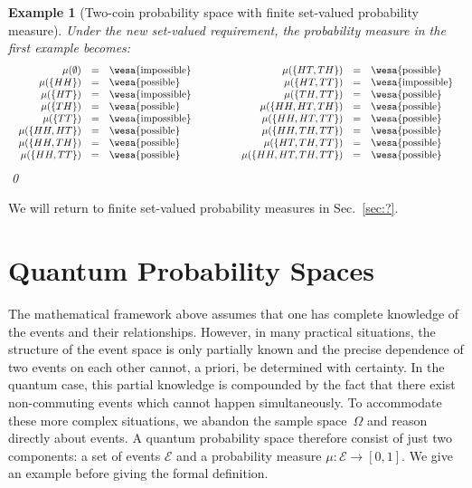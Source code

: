 \documentclass{article}
\theoremstyle{indented}
\newtheorem{example}{Example}
\newcommand{\qevents}{\ensuremath{\mathcal{E}}}
\newcommand{\pmeas}{\ensuremath{\mu}}
\newcommand{\poss}{{\mbox{\wesa{possible}}}}
\newcommand{\imposs}{{\mbox{\wesa{impossible}}}}
\theoremstyle{plain}
\theoremstyle{plain}
\begin{document}
\begin{example}[Two-coin probability space with finite set-valued
  probability measure] Under the new set-valued requirement, the
  probability measure in the first example becomes:
\[\begin{array}{c@{\qquad\qquad}c}
\begin{array}{rcl}
\pmeas(\emptyset) &=& \imposs \\
\pmeas(\{ HH \}) &=& \poss \\
\pmeas(\{ HT \}) &=& \imposs \\
\pmeas(\{ TH \}) &=& \poss \\
\pmeas(\{ TT \}) &=& \imposs \\
\pmeas(\{  HH, HT \}) &=& \poss \\
\pmeas(\{  HH, TH \}) &=& \poss \\
\pmeas(\{  HH , TT \}) &=& \poss \\
\end{array} & \begin{array}{rcl}
\pmeas(\{  HT, TH \}) &=& \poss \\
\pmeas(\{  HT , TT \}) &=& \imposs \\
\pmeas(\{  TH , TT \}) &=& \poss \\
\pmeas(\{  HH, HT, TH \}) &=& \poss \\
\pmeas(\{  HH, HT, TT \}) &=& \poss \\
\pmeas(\{  HH, TH, TT \}) &=& \poss \\
\pmeas(\{  HT, TH, TT \}) &=& \poss \\
\pmeas(\{  HH, HT, TH, TT \}) &=& \poss 
\end{array}
\end{array}\]
\qed\end{example}

We will return to finite set-valued probability measures in Sec.~\ref{sec:?}.

\section{Quantum Probability Spaces}

The mathematical framework above assumes that one has complete
knowledge of the events and their relationships. However, in many
practical situations, the structure of the event space is only
partially known and the precise dependence of two events on each other
cannot, a priori, be determined with certainty. In the quantum case,
this partial knowledge is compounded by the fact that there exist
non-commuting events which cannot happen simultaneously. To
accommodate these more complex situations, we abandon the sample
space~$\Omega$ and reason directly about events. A quantum probability
space therefore consist of just two components: a set of events
$\qevents$ and a probability measure
$\mu : \qevents \rightarrow [0,1]$. We give an example before giving
the formal definition.
\end{document}
